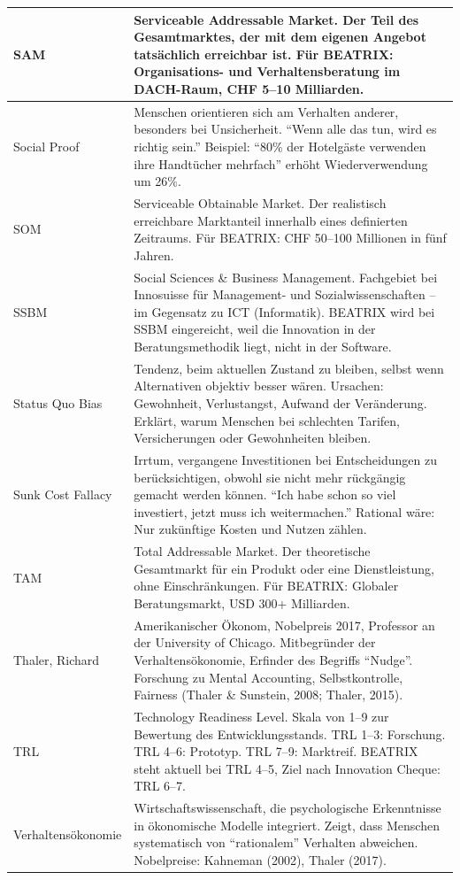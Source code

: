 \documentclass[11pt,a4paper]{article}
\begin{document}
\begin{longtable}{@{}L{4cm}L{10cm}@{}}
\midrule
SAM & Serviceable Addressable Market. Der Teil des Gesamtmarktes, der mit dem eigenen Angebot tatsächlich erreichbar ist. Für BEATRIX: Organisations- und Verhaltensberatung im DACH-Raum, CHF 5--10 Milliarden. \\
\midrule
Social Proof & Menschen orientieren sich am Verhalten anderer, besonders bei Unsicherheit. ``Wenn alle das tun, wird es richtig sein.'' Beispiel: ``80\% der Hotelgäste verwenden ihre Handtücher mehrfach'' erhöht Wiederverwendung um 26\%. \\
\midrule
SOM & Serviceable Obtainable Market. Der realistisch erreichbare Marktanteil innerhalb eines definierten Zeitraums. Für BEATRIX: CHF 50--100 Millionen in fünf Jahren. \\
\midrule
SSBM & Social Sciences \& Business Management. Fachgebiet bei Innosuisse für Management- und Sozialwissenschaften -- im Gegensatz zu ICT (Informatik). BEATRIX wird bei SSBM eingereicht, weil die Innovation in der Beratungsmethodik liegt, nicht in der Software. \\
\midrule
Status Quo Bias & Tendenz, beim aktuellen Zustand zu bleiben, selbst wenn Alternativen objektiv besser wären. Ursachen: Gewohnheit, Verlustangst, Aufwand der Veränderung. Erklärt, warum Menschen bei schlechten Tarifen, Versicherungen oder Gewohnheiten bleiben. \\
\midrule
Sunk Cost Fallacy & Irrtum, vergangene Investitionen bei Entscheidungen zu berücksichtigen, obwohl sie nicht mehr rückgängig gemacht werden können. ``Ich habe schon so viel investiert, jetzt muss ich weitermachen.'' Rational wäre: Nur zukünftige Kosten und Nutzen zählen. \\
\midrule
TAM & Total Addressable Market. Der theoretische Gesamtmarkt für ein Produkt oder eine Dienstleistung, ohne Einschränkungen. Für BEATRIX: Globaler Beratungsmarkt, USD 300+ Milliarden. \\
\midrule
Thaler, Richard & Amerikanischer Ökonom, Nobelpreis 2017, Professor an der University of Chicago. Mitbegründer der Verhaltensökonomie, Erfinder des Begriffs ``Nudge''. Forschung zu Mental Accounting, Selbstkontrolle, Fairness (Thaler \& Sunstein, 2008; Thaler, 2015). \\
\midrule
TRL & Technology Readiness Level. Skala von 1--9 zur Bewertung des Entwicklungsstands. TRL 1--3: Forschung. TRL 4--6: Prototyp. TRL 7--9: Marktreif. BEATRIX steht aktuell bei TRL 4--5, Ziel nach Innovation Cheque: TRL 6--7. \\
\midrule
Verhaltensökonomie & Wirtschaftswissenschaft, die psychologische Erkenntnisse in ökonomische Modelle integriert. Zeigt, dass Menschen systematisch von ``rationalem'' Verhalten abweichen. Nobelpreise: Kahneman (2002), Thaler (2017). \\

\end{longtable}
\end{document}

